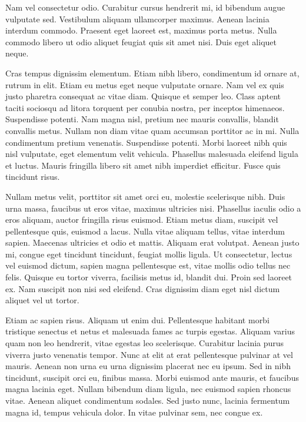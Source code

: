 Nam vel consectetur odio. Curabitur cursus hendrerit mi, id bibendum augue vulputate sed. Vestibulum aliquam ullamcorper maximus. Aenean lacinia interdum commodo. Praesent eget laoreet est, maximus porta metus. Nulla commodo libero ut odio aliquet feugiat quis sit amet nisi. Duis eget aliquet neque.

Cras tempus dignissim elementum. Etiam nibh libero, condimentum id ornare at, rutrum in elit. Etiam eu metus eget neque vulputate ornare. Nam vel ex quis justo pharetra consequat ac vitae diam. Quisque et semper leo. Class aptent taciti sociosqu ad litora torquent per conubia nostra, per inceptos himenaeos. Suspendisse potenti. Nam magna nisl, pretium nec mauris convallis, blandit convallis metus. Nullam non diam vitae quam accumsan porttitor ac in mi. Nulla condimentum pretium venenatis. Suspendisse potenti. Morbi laoreet nibh quis nisl vulputate, eget elementum velit vehicula. Phasellus malesuada eleifend ligula et luctus. Mauris fringilla libero sit amet nibh imperdiet efficitur. Fusce quis tincidunt risus.

Nullam metus velit, porttitor sit amet orci eu, molestie scelerisque nibh. Duis urna massa, faucibus ut eros vitae, maximus ultricies nisi. Phasellus iaculis odio a eros aliquam, auctor fringilla risus euismod. Etiam metus diam, suscipit vel pellentesque quis, euismod a lacus. Nulla vitae aliquam tellus, vitae interdum sapien. Maecenas ultricies et odio et mattis. Aliquam erat volutpat. Aenean justo mi, congue eget tincidunt tincidunt, feugiat mollis ligula. Ut consectetur, lectus vel euismod dictum, sapien magna pellentesque est, vitae mollis odio tellus nec felis. Quisque eu tortor viverra, facilisis metus id, blandit dui. Proin sed laoreet ex. Nam suscipit non nisi sed eleifend. Cras dignissim diam eget nisl dictum aliquet vel ut tortor.

Etiam ac sapien risus. Aliquam ut enim dui. Pellentesque habitant morbi tristique senectus et netus et malesuada fames ac turpis egestas. Aliquam varius quam non leo hendrerit, vitae egestas leo scelerisque. Curabitur lacinia purus viverra justo venenatis tempor. Nunc at elit at erat pellentesque pulvinar at vel mauris. Aenean non urna eu urna dignissim placerat nec eu ipsum. Sed in nibh tincidunt, suscipit orci eu, finibus massa. Morbi euismod ante mauris, et faucibus magna lacinia eget. Nullam bibendum diam ligula, nec euismod sapien rhoncus vitae. Aenean aliquet condimentum sodales. Sed justo nunc, lacinia fermentum magna id, tempus vehicula dolor. In vitae pulvinar sem, nec congue ex.

